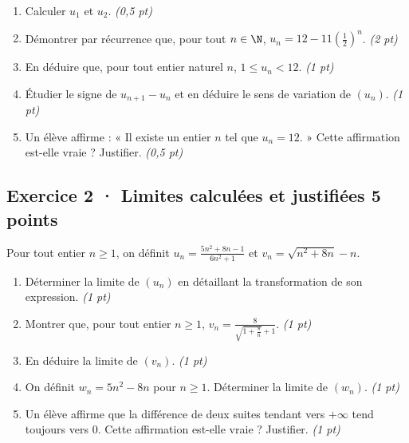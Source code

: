 \begin{enumerate}

\item Calculer $u_1$ et $u_2$. \hfill\textit{(0,5 pt)}

\item Démontrer par récurrence que, pour tout $n\in\N$, $u_n=12-11\left(\frac{1}{2}\right)^n$. \hfill\textit{(2 pt)}

\item En déduire que, pour tout entier naturel $n$, $1\le u_n<12$. \hfill\textit{(1 pt)}

\item Étudier le signe de $u_{n+1}-u_n$ et en déduire le sens de variation de $(u_n)$. \hfill\textit{(1 pt)}

\item Un élève affirme : « Il existe un entier $n$ tel que $u_n=12$. » Cette affirmation est-elle vraie ? Justifier. \hfill\textit{(0,5 pt)}

\end{enumerate}

\subsection*{Exercice 2 · Limites calculées et justifiées \hfill 5 points}Pour tout entier $n\ge1$, on définit $u_n=\frac{5n^2+8n-1}{6n^2+1}$ et $v_n=\sqrt{n^2+8n}-n$.

\begin{enumerate}

\item Déterminer la limite de $(u_n)$ en détaillant la transformation de son expression. \hfill\textit{(1 pt)}

\item Montrer que, pour tout entier $n\ge1$, $v_n=\frac{8}{\sqrt{1+\frac{8}n}+1}$. \hfill\textit{(1 pt)}

\item En déduire la limite de $(v_n)$. \hfill\textit{(1 pt)}

\item On définit $w_n=5n^2-8n$ pour $n\ge1$. Déterminer la limite de $(w_n)$. \hfill\textit{(1 pt)}

\item Un élève affirme que la différence de deux suites tendant vers $+\infty$ tend toujours vers $0$. Cette affirmation est-elle vraie ? Justifier. \hfill\textit{(1 pt)}

\end{enumerate}

